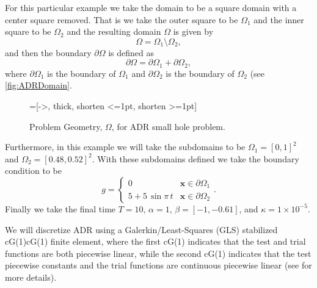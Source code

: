     For this particular example we take the domain to be a square domain with a
    center square removed. That is we take the outer square to be $\Omega_1$ and
    the inner square to be $\Omega_2$ and the resulting domain $\Omega$ is given
    by
    \begin{equation}
        \Omega = \Omega_1\setminus \Omega_2,
        \label{eq:ADRDomain}
    \end{equation}
    and then the boundary $\partial \Omega$ is defined as
    \begin{equation}
        \partial \Omega = \partial \Omega_1 + \partial \Omega_2,
        \label{eq:ADRBoundary}
    \end{equation}
    where $\partial \Omega_1$ is the boundary of $\Omega_1$ and $\partial
    \Omega_2$ is the boundary of $\Omega_2$ (see \autoref{fig:ADRDomain}.

    \begin{figure}[h]
        \centering
        =[->, thick, shorten <=1pt, shorten >=1pt]
        \caption{Problem Geometry, $\Omega$, for ADR small hole problem.}
        \label{fig:ADRDomain}
    \end{figure}

    Furthermore, in this example we will take the subdomains to be $\Omega_1 =
    [0,1]^2$ and $\Omega_2 = [0.48,0.52]^2$. With these subdomains defined we
    take the boundary condition to be
    \begin{equation}
        g = \begin{cases}
            0   &\mathbf{x} \in \partial \Omega_1 \\
            5 + 5\, \sin \pi\, t  &\mathbf{x} \in \partial \Omega_2
        \end{cases}.
        \label{eq:ADRBCs}
    \end{equation}
    Finally we take the final time $T=10,\, \alpha=1,\, \beta = \left[ -1,
    -0.61 \right]$, and $\kappa = 1\times10^{-5}$.

    We will discretize ADR using a Galerkin\slash Least-Squares (GLS) stabilized
    cG(1)cG(1) finite element, where the first cG(1) indicates that the test and
    trial functions are both piecewise linear, while the second cG(1) indicates
    that the test piecewise constants and the trial functions are continuous
    piecewise linear (see \cite{Hoffman2006a} for more details).

